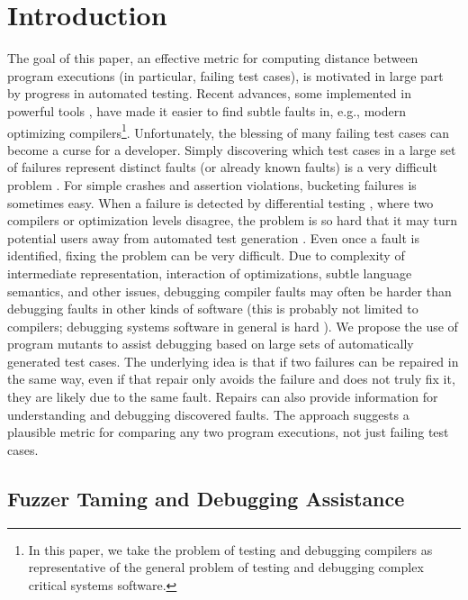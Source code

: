\section{Introduction}

The goal of this paper, an effective metric for computing distance between program executions (in particular, failing test cases), is motivated in large part by progress in automated testing.  Recent advances, some implemented in powerful tools \cite{csmith,jsfunfuzz,ISSTA12,LangFuzz,ZhendongPLDI,ZhendongOOPSLA}, have made it easier to find subtle faults in, e.g., modern optimizing compilers\footnote{In this paper, we take the problem of testing and debugging compilers as representative of the general problem of testing and debugging complex critical systems software.}.  Unfortunately, the blessing of many failing test cases can become a curse for a developer.  Simply discovering which test cases in a large set of failures represent distinct faults (or already known faults) is a very difficult problem \cite{PLDI13,Podgurski04}.  For simple crashes and assertion violations, bucketing failures is sometimes easy.  When a failure is detected by differential testing \cite{Differential}, where two compilers or optimization levels disagree, the problem is so hard that it may turn potential users away from automated test generation \cite{PLDI13}.  Even once a fault is identified, fixing the problem can be very difficult.  Due to complexity of intermediate representation, interaction of optimizations, subtle language semantics, and other issues, debugging compiler faults may often be harder than debugging faults in other kinds of software (this is probably not limited to compilers; debugging systems software in general is hard \cite{mickens}).
We propose the use of program mutants \cite{mutant} to assist debugging based on large sets of automatically generated test cases.  The underlying idea is that if two failures can be repaired in the same way, even if that repair only avoids the failure and does not truly fix it, they are likely due to the same fault. Repairs can also provide  information for understanding and debugging discovered faults. The approach suggests a plausible metric for comparing any two program executions, not just failing test cases.

\subsection{Fuzzer Taming and Debugging Assistance}

